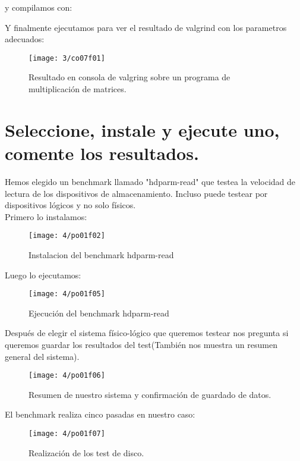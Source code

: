 y compilamos con:
	
	Y finalmente ejecutamos para ver el resultado de valgrind con los parametros adecuados:
	
	\begin{figure}[H]
	\centering
	\texttt{[image: 3/co07f01]}
	\caption{Resultado en consola de valgring sobre un programa de multiplicación de matrices.}
	\label{fig:f29}
	\end{figure}

\clearpage
\section{Seleccione, instale y ejecute uno, comente los	resultados.}

Hemos elegido un benchmark llamado "hdparm-read" que testea la velocidad de lectura de los dispositivos de almacenamiento. Incluso puede testear por dispositivos lógicos y no solo físicos.\\
Primero lo instalamos:
\begin{figure}[H]
\centering
\texttt{[image: 4/po01f02]}
\caption{Instalacion del benchmark hdparm-read}
\label{fig:f30}
\end{figure}


Luego lo ejecutamos:
\begin{figure}[H]
\centering
\texttt{[image: 4/po01f05]}
\caption{Ejecución del benchmark hdparm-read}
\label{fig:f31}
\end{figure}

Después de elegir el sistema físico-lógico que queremos testear nos pregunta si queremos guardar los resultados del test(También nos muestra un resumen general del sistema).
\begin{figure}[H]
\centering
\texttt{[image: 4/po01f06]}
\caption{Resumen de nuestro sistema y confirmación de guardado de datos.}
\label{fig:f32}
\end{figure}

El benchmark realiza cinco pasadas en nuestro caso:
\begin{figure}[H]
\centering
\texttt{[image: 4/po01f07]}
\caption{Realización de los test de disco.}
\label{fig:f33}
\end{figure}

